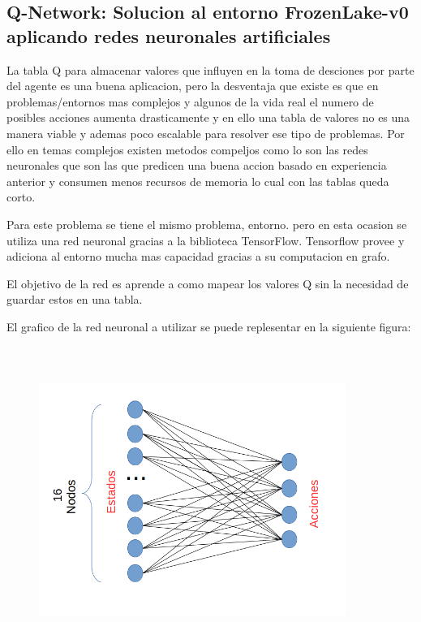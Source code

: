 \subsection{Q-Network: Solucion al entorno FrozenLake-v0 aplicando redes neuronales artificiales}

La tabla Q para almacenar valores que influyen en la toma de desciones por parte del agente es una buena aplicacion, pero la desventaja que existe es que en problemas/entornos mas complejos y algunos de la vida real el numero de posibles acciones aumenta drasticamente y en ello una tabla de valores no es una manera viable y ademas poco escalable para resolver ese tipo de problemas. Por ello en temas complejos existen metodos compeljos como lo son las redes neuronales que son las que predicen una buena accion basado en experiencia anterior y consumen menos recursos de memoria lo cual con las tablas queda corto.

Para este problema se tiene el mismo problema, entorno. pero en esta ocasion se utiliza una red neuronal gracias a la biblioteca TensorFlow. Tensorflow provee y adiciona al entorno mucha mas capacidad gracias a su computacion en grafo.

El objetivo de la red es aprende a como mapear los valores Q sin la necesidad de guardar estos en una tabla.

El grafico de la red neuronal a utilizar se puede replesentar en la siguiente figura:

\begin{figure}[ht]
	\centering
	\includegraphics*[width=10cm,height=10cm,keepaspectratio]{figuras/red} 
	\label{fig:formula Q-Tables}
\end{figure}

